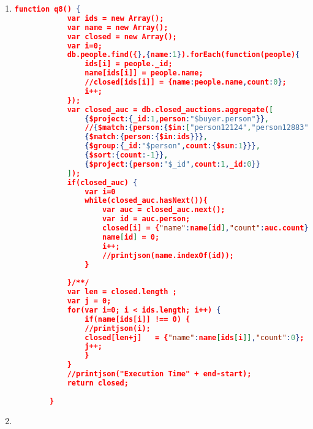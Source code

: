 \begin{enumerate}[label=Q\arabic*.]
	
    \item %
	\begin{lstlisting}[language=JSON,   basicstyle=\scriptsize]
	   function q8() {
        	var ids = new Array();
        	var name = new Array();
        	var closed = new Array();
        	var i=0;
        	db.people.find({},{name:1}).forEach(function(people){
        		ids[i] = people._id;
        		name[ids[i]] = people.name;
        		//closed[ids[i]] = {name:people.name,count:0};
        		i++;
        	});
        	var closed_auc = db.closed_auctions.aggregate([
        		{$project:{_id:1,person:"$buyer.person"}},
        		//{$match:{person:{$in:["person12124","person12883"]}}},
        		{$match:{person:{$in:ids}}},
        		{$group:{_id:"$person",count:{$sum:1}}},
        		{$sort:{count:-1}},
        		{$project:{person:"$_id",count:1,_id:0}}
        	]);
        	if(closed_auc) {
        		var i=0
        		while(closed_auc.hasNext()){
        			var auc = closed_auc.next();
        			var id = auc.person;
        			closed[i] = {"name":name[id],"count":auc.count}
        			name[id] = 0;
        			i++;
        			//printjson(name.indexOf(id));
        		}
        		
        	}/**/
        	var len = closed.length ;
        	var j = 0;
        	for(var i=0; i < ids.length; i++) {
        		if(name[ids[i]] !== 0) {
        		//printjson(i);
        		closed[len+j]	= {"name":name[ids[i]],"count":0};
        		j++;
        		}
        	}
        	//printjson("Execution Time" + end-start);
        	return closed;
        	
        }
	\end{lstlisting}
	
	
    \item %
	\begin{lstlisting}[language=JSON,   basicstyle=\scriptsize]
	   
	\end{lstlisting}
	

\end{enumerate}
